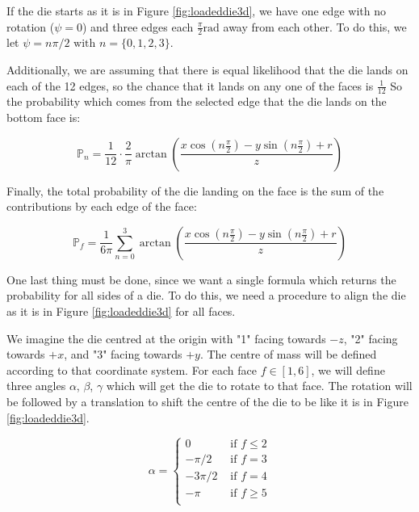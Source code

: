 \documentclass[english,12pt,a4paper,final]{article}
\begin{document}
If the die starts as it is in Figure \ref{fig:loadeddie3d}, we have one edge with no rotation ($\psi=0$) and three edges each $\frac{\pi}{2} \text{rad}$ away from each other. To do this, we let $\psi = n\pi/2 \text{ with } n=\{0, 1, 2, 3\}$.

Additionally, we are assuming that there is equal likelihood that the die lands on each of the 12 edges, so the chance that it lands on any one of the faces is $\frac{1}{12}$ So the probability which comes from the selected edge that the die lands on the bottom face is:

\begin{equation*}
	\mathbb{P}_n = \frac{1}{12} \cdot \frac{2}{\pi} \arctan\left(\frac{x\cos(n\frac{\pi}{2})-y\sin(n\frac{\pi}{2})+r}{z}\right)
\end{equation*}

Finally, the total probability of the die landing on the face is the sum of the contributions by each edge of the face:

\begin{equation*}\label{dieFaceProb}
	\mathbb{P}_f = \frac{1}{6\pi} \sum_{n=0}^{3} \arctan\left(\frac{x\cos(n\frac{\pi}{2})-y\sin(n\frac{\pi}{2})+r}{z}\right)
\end{equation*}

One last thing must be done, since we want a single formula which returns the probability for all sides of a die. To do this, we need a procedure to align the die as it is in Figure \ref{fig:loadeddie3d} for all faces.

We imagine the die centred at the origin with "1" facing towards $-z$, "2" facing towards $+x$, and "3" facing towards $+y$. The centre of mass will be defined according to that coordinate system. For each face $f \in [1, 6] $, we will define three angles $\alpha$, $\beta$, $\gamma$ which will get the die to rotate to that face. The rotation will be followed by a translation to shift the centre of the die to be like it is in Figure \ref{fig:loadeddie3d}.

\begin{equation*}
	\alpha = \begin{cases} 
		0 & \text{ if } f \le 2 \\
		-\pi/2 & \text{ if } f = 3 \\
		-3\pi/2 & \text{ if } f = 4 \\
		-\pi & \text{ if } f \ge 5  \\
	\end{cases}
\end{equation*}
\end{document}
